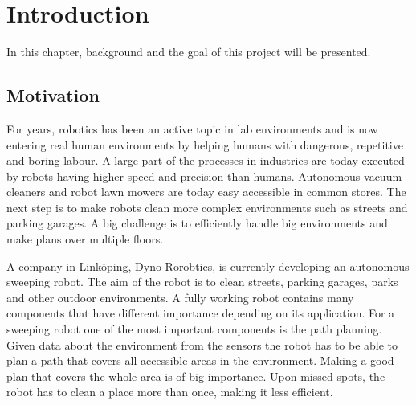 

\chapter{Introduction}
\label{cha:introduction}

In this chapter, background and the goal of this project will be presented. 

\section{Motivation}
\label{sec:motivation}



For years, robotics has been an active topic in lab environments and is now entering real human environments by helping humans with dangerous, repetitive and boring labour. A large part of the processes in industries are today executed by robots having higher speed and precision than humans. Autonomous vacuum cleaners and robot lawn mowers are today easy accessible in common stores. The next step is to make robots clean more complex environments such as streets and parking garages. A big challenge is to efficiently handle big environments and make plans over multiple floors. 

A company in Linköping, Dyno Rorobtics, is currently developing an autonomous sweeping robot. The aim of the robot is to clean streets, parking garages, parks and other outdoor environments. A fully working robot contains many components that have different importance depending on its application. For a sweeping robot one of the most important components is the path planning. Given data about the environment from the sensors the robot has to be able to plan a path that covers all accessible areas in the environment. Making a good plan that covers the whole area is of big importance. Upon missed spots, the robot has to clean a place more than once, making it less efficient.

